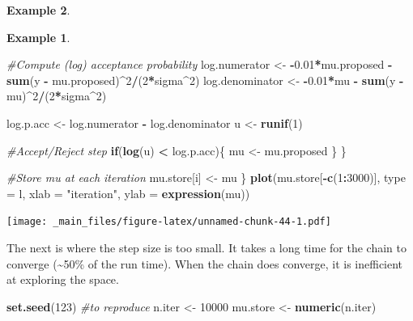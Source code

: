 \documentclass[
]{book}
\newenvironment{Shaded}{\begin{snugshade}}{\end{snugshade}}
\newcommand{\AttributeTok}[1]{\textcolor[rgb]{0.13,0.29,0.53}{#1}}
\newcommand{\CommentTok}[1]{\textcolor[rgb]{0.56,0.35,0.01}{\textit{#1}}}
\newcommand{\ControlFlowTok}[1]{\textcolor[rgb]{0.13,0.29,0.53}{\textbf{#1}}}
\newcommand{\DecValTok}[1]{\textcolor[rgb]{0.00,0.00,0.81}{#1}}
\newcommand{\FloatTok}[1]{\textcolor[rgb]{0.00,0.00,0.81}{#1}}
\newcommand{\FunctionTok}[1]{\textcolor[rgb]{0.13,0.29,0.53}{\textbf{#1}}}
\newcommand{\NormalTok}[1]{#1}
\newcommand{\OtherTok}[1]{\textcolor[rgb]{0.56,0.35,0.01}{#1}}
\newcommand{\SpecialCharTok}[1]{\textcolor[rgb]{0.81,0.36,0.00}{\textbf{#1}}}
\newcommand{\StringTok}[1]{\textcolor[rgb]{0.31,0.60,0.02}{#1}}
\theoremstyle{definition}
\theoremstyle{definition}
\newtheorem{example}{Example}[chapter]
\theoremstyle{definition}
\theoremstyle{definition}
\theoremstyle{remark}
\begin{document}
\begin{example}
\begin{example}
\begin{Shaded}
\begin{Highlighting}[]
    \CommentTok{\#Compute (log) acceptance probability}
\NormalTok{    log.numerator   }\OtherTok{\textless{}{-}} \SpecialCharTok{{-}}\FloatTok{0.01}\SpecialCharTok{*}\NormalTok{mu.proposed }\SpecialCharTok{{-}} 
                        \FunctionTok{sum}\NormalTok{(y }\SpecialCharTok{{-}}\NormalTok{ mu.proposed)}\SpecialCharTok{\^{}}\DecValTok{2}\SpecialCharTok{/}\NormalTok{(}\DecValTok{2}\SpecialCharTok{*}\NormalTok{sigma}\SpecialCharTok{\^{}}\DecValTok{2}\NormalTok{)}
\NormalTok{    log.denominator }\OtherTok{\textless{}{-}} \SpecialCharTok{{-}}\FloatTok{0.01}\SpecialCharTok{*}\NormalTok{mu }\SpecialCharTok{{-}} \FunctionTok{sum}\NormalTok{(y }\SpecialCharTok{{-}}\NormalTok{ mu)}\SpecialCharTok{\^{}}\DecValTok{2}\SpecialCharTok{/}\NormalTok{(}\DecValTok{2}\SpecialCharTok{*}\NormalTok{sigma}\SpecialCharTok{\^{}}\DecValTok{2}\NormalTok{)}
    
\NormalTok{    log.p.acc }\OtherTok{\textless{}{-}}\NormalTok{ log.numerator }\SpecialCharTok{{-}}\NormalTok{ log.denominator}
\NormalTok{    u }\OtherTok{\textless{}{-}} \FunctionTok{runif}\NormalTok{(}\DecValTok{1}\NormalTok{)}
    
    \CommentTok{\#Accept/Reject step}
    \ControlFlowTok{if}\NormalTok{(}\FunctionTok{log}\NormalTok{(u) }\SpecialCharTok{\textless{}}\NormalTok{ log.p.acc)\{}
\NormalTok{      mu }\OtherTok{\textless{}{-}}\NormalTok{ mu.proposed}
\NormalTok{    \}}
\NormalTok{  \}}
  
  \CommentTok{\#Store mu at each iteration}
\NormalTok{  mu.store[i] }\OtherTok{\textless{}{-}}\NormalTok{ mu}
\NormalTok{\}}
\FunctionTok{plot}\NormalTok{(mu.store[}\SpecialCharTok{{-}}\FunctionTok{c}\NormalTok{(}\DecValTok{1}\SpecialCharTok{:}\DecValTok{3000}\NormalTok{)], }\AttributeTok{type =} \StringTok{\textquotesingle{}l\textquotesingle{}}\NormalTok{, }\AttributeTok{xlab =} \StringTok{"iteration"}\NormalTok{, }
     \AttributeTok{ylab =} \FunctionTok{expression}\NormalTok{(mu))}
\end{Highlighting}
\end{Shaded}

\texttt{[image: \_main\_files/figure-latex/unnamed-chunk-44-1.pdf]}

The next is where the step size is too small. It takes a long time for the chain to converge (\textasciitilde50\% of the run time). When the chain does converge, it is inefficient at exploring the space.

\begin{Shaded}
\begin{Highlighting}[]
\FunctionTok{set.seed}\NormalTok{(}\DecValTok{123}\NormalTok{) }\CommentTok{\#to reproduce}
\NormalTok{n.iter   }\OtherTok{\textless{}{-}} \DecValTok{10000}
\NormalTok{mu.store }\OtherTok{\textless{}{-}} \FunctionTok{numeric}\NormalTok{(n.iter)}


\end{Highlighting}
\end{Shaded}
\end{example}
\end{example}
\end{document}
